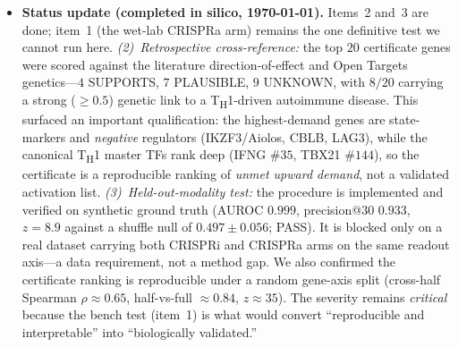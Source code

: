 \documentclass[11pt]{article}
\newcommand{\Th}[1]{T\textsubscript{H}#1}
\begin{document}
\begin{itemize}
\begin{enumerate}
obtainable now, without new experiments.
\item \emph{Held-out-modality test (immediate, computational).} Where a screen contains
\emph{both} interference and activation arms, hide the activation arm, generate the certificate
from knockdowns alone, and check whether the named genes are exactly those the hidden activation
arm shows to be effective. This is the strongest test achievable purely in silico and should be
the first thing done.
\end{enumerate}
\item[] \textbf{Status update (completed in silico, \today).} Items~2 and~3 are done; item~1
(the wet-lab CRISPRa arm) remains the one definitive test we cannot run here.
\emph{(2)~Retrospective cross-reference:} the top $20$ certificate genes were scored against
the literature direction-of-effect and Open Targets genetics---$4$ SUPPORTS, $7$ PLAUSIBLE, $9$
UNKNOWN, with $8/20$ carrying a strong ($\ge0.5$) genetic link to a \Th{1}-driven autoimmune
disease. This surfaced an important qualification: the highest-demand genes are state-markers
and \emph{negative} regulators (IKZF3/Aiolos, CBLB, LAG3), while the canonical \Th{1} master
TFs rank deep (IFNG $\#35$, TBX21 $\#144$), so the certificate is a reproducible ranking of
\emph{unmet upward demand}, not a validated activation list. \emph{(3)~Held-out-modality test:}
the procedure is implemented and verified on synthetic ground truth (AUROC $0.999$,
precision@30 $0.933$, $z=8.9$ against a shuffle null of $0.497\pm0.056$; PASS). It is blocked
only on a real dataset carrying both CRISPRi and CRISPRa arms on the same readout axis---a data
requirement, not a method gap. We also confirmed the certificate ranking is reproducible under a
random gene-axis split (cross-half Spearman $\rho\approx0.65$, half-vs-full $\approx0.84$,
$z\approx35$). The severity remains \emph{critical} because the bench test (item~1) is what
would convert ``reproducible and interpretable'' into ``biologically validated.''
\end{itemize}
\end{document}
